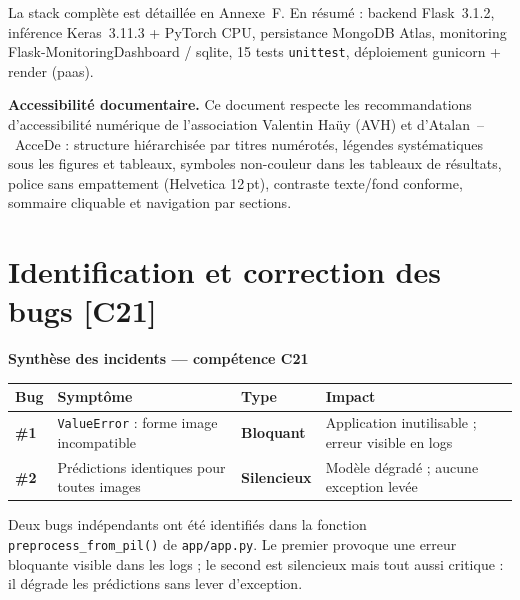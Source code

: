 \documentclass[french, a4paper, 12pt]{article}
\begin{document}
La stack complète est détaillée en Annexe~F. En résumé : backend Flask~3.1.2,
inférence Keras~3.11.3 + PyTorch CPU, persistance MongoDB Atlas, monitoring
Flask-MonitoringDashboard / \gls{sqlite}, 15 tests \texttt{unittest}, déploiement
\gls{gunicorn} + \gls{render} (\gls{paas}).

\begin{mdframed}[linewidth=0.6pt, linecolor=black!25, backgroundcolor=gray!2,
                 innertopmargin=5pt, innerbottommargin=5pt, skipabove=6pt]
\small\textbf{Accessibilité documentaire.} Ce document respecte les recommandations
d'accessibilité numérique de l'association Valentin Haüy (AVH) et d'Atalan~--~AcceDe :
structure hiérarchisée par titres numérotés, légendes systématiques sous les figures
et tableaux, symboles non-couleur dans les tableaux de résultats, police sans empattement
(Helvetica 12\,pt), contraste texte/fond conforme, sommaire cliquable et navigation
par sections.
\end{mdframed}

\section{Identification et correction des bugs \textnormal{\small\textcolor{RNCPred}{[C21]}}}

\begin{mdframed}[linewidth=1pt, linecolor=black!40, backgroundcolor=gray!4,
                 innertopmargin=8pt, innerbottommargin=8pt]
\small
\textbf{Synthèse des incidents — compétence C21}

\renewcommand{\arraystretch}{1.2}
\begin{tabularx}{\linewidth}{>{\bfseries\centering}p{1.2cm} >{\raggedright}p{3.6cm} >{\raggedright}p{2.8cm} >{\raggedright\arraybackslash}X}
    \toprule
    Bug & Symptôme & Type & Impact \\
    \midrule
    \#1 & \texttt{ValueError} : forme image incompatible & \textbf{Bloquant} & Application inutilisable ; erreur visible en logs \\
    \#2 & Prédictions identiques pour toutes images & \textbf{Silencieux} & Modèle dégradé ; aucune exception levée \\
    \bottomrule
\end{tabularx}
\end{mdframed}

Deux bugs indépendants ont été identifiés dans la fonction
\texttt{preprocess\_from\_pil()} de \texttt{app/app.py}. Le premier provoque
une erreur bloquante visible dans les logs ; le second est silencieux mais
tout aussi critique : il dégrade les prédictions sans lever d'exception.
\end{document}
